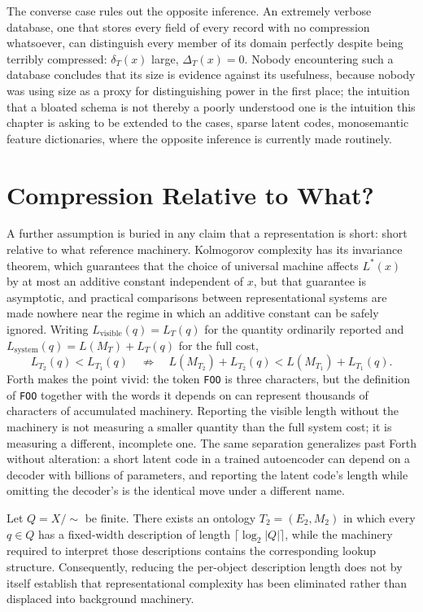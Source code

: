 The converse case rules out the opposite inference. An extremely verbose database, one that stores every field of every record with no compression whatsoever, can distinguish every member of its domain perfectly despite being terribly compressed: $\delta_T(x)$ large, $\Delta_T(x) = 0$. Nobody encountering such a database concludes that its size is evidence against its usefulness, because nobody was using size as a proxy for distinguishing power in the first place; the intuition that a bloated schema is not thereby a poorly understood one is the intuition this chapter is asking to be extended to the cases, sparse latent codes, monosemantic feature dictionaries, where the opposite inference is currently made routinely.

\section{Compression Relative to What?}

A further assumption is buried in any claim that a representation is short: short relative to what reference machinery. Kolmogorov complexity has its invariance theorem, which guarantees that the choice of universal machine affects $L^\ast(x)$ by at most an additive constant independent of $x$, but that guarantee is asymptotic, and practical comparisons between representational systems are made nowhere near the regime in which an additive constant can be safely ignored. Writing $L_{\mathrm{visible}}(q) = L_T(q)$ for the quantity ordinarily reported and $L_{\mathrm{system}}(q) = L(M_T) + L_T(q)$ for the full cost,
\[
L_{T_2}(q) < L_{T_1}(q) \quad \not\Rightarrow \quad L(M_{T_2}) + L_{T_2}(q) < L(M_{T_1}) + L_{T_1}(q).
\]
Forth makes the point vivid: the token \texttt{FOO} is three characters, but the definition of \texttt{FOO} together with the words it depends on can represent thousands of characters of accumulated machinery. Reporting the visible length without the machinery is not measuring a smaller quantity than the full system cost; it is measuring a different, incomplete one. The same separation generalizes past Forth without alteration: a short latent code in a trained autoencoder can depend on a decoder with billions of parameters, and reporting the latent code's length while omitting the decoder's is the identical move under a different name.

\begin{proposition}
\label{prop:machinery-displacement}
Let $Q = X/\!\sim$ be finite. There exists an ontology $T_2 = (E_2,M_2)$ in which every $q \in Q$ has a fixed-width description of length $\lceil \log_2 |Q| \rceil$, while the machinery required to interpret those descriptions contains the corresponding lookup structure. Consequently, reducing the per-object description length does not by itself establish that representational complexity has been eliminated rather than displaced into background machinery.
\end{proposition}

